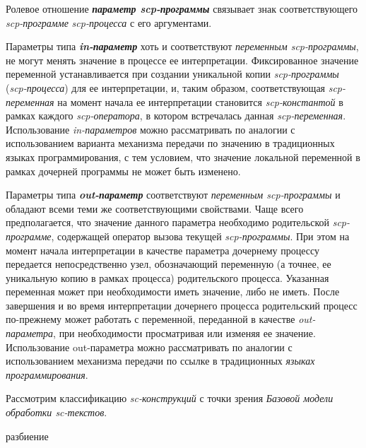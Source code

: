 Ролевое отношение \textbf{\textit{параметр scp-программы\scnrolesign}} связывает знак соответствующего \textit{scp-программе} \textit{\mbox{scp-процесса}} с его аргументами.

Параметры типа \textbf{\textit{in-параметр\scnrolesign}} хоть и соответствуют \textit{переменным scp-программы\scnrolesign}, не могут менять значение в процессе ее интерпретации. Фиксированное значение переменной устанавливается при создании уникальной копии \textit{scp-программы} (\textit{scp-процесса}) для ее интерпретации, и, таким образом, соответствующая \textit{scp-переменная\scnrolesign} на момент начала ее интерпретации становится \textit{scp-константой\scnrolesign} в рамках каждого \textit{scp-оператора}, в котором встречалась данная \textit{scp-переменная\scnrolesign}. Использование \textit{in-параметров} можно рассматривать по аналогии с использованием варианта механизма передачи по значению в традиционных языках программирования, с тем условием, что значение локальной переменной в рамках дочерней программы не может быть изменено.

Параметры типа \textbf{\textit{out-параметр\scnrolesign}} соответствуют \textit{переменным scp-программы\scnrolesign} и обладают всеми теми же соответствующими свойствами. Чаще всего предполагается, что значение данного параметра необходимо родительской \textit{scp-программе}, содержащей оператор вызова текущей \textit{scp-программы}. При этом на момент начала интерпретации в качестве параметра дочернему процессу передается непосредственно узел, обозначающий переменную (а точнее, ее уникальную копию в рамках процесса) родительского процесса. Указанная переменная может при необходимости иметь значение, либо не иметь. После завершения и во время интерпретации дочернего процесса родительский процесс по-прежнему может работать с переменной, переданной в качестве \textit{out-параметра\scnrolesign}, при необходимости просматривая или изменяя ее значение. Использование out-параметра можно рассматривать по аналогии с использованием механизма передачи по ссылке в традиционных \textit{языках программирования}.

Рассмотрим классификацию \textit{sc-конструкций} с точки зрения \textit{Базовой модели обработки sc-текстов}.

\begin{SCn}
\begin{scnindent}
	\begin{scneqtoset}
	\end{scneqtoset}
\begin{scnindent}
\begin{scnrelfromset}{разбиение}
\end{scnrelfromset}
\end{scnindent}
\end{scnindent}
\end{SCn}

